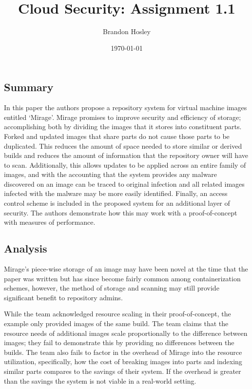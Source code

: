 \documentclass[]{article}
\title{Cloud Security: Assignment 1.1}
\author{Brandon Hosley}
\date{\today}
\begin{document}
\maketitle

\subsection*{Summary}

In this paper \cite{inproceedings} the authors propose a repository system for virtual machine images entitled ‘Mirage’. 
Mirage promises to improve security and efficiency of storage;
accomplishing both by dividing the images that it stores into constituent parts.
Forked and updated images that share parts do not cause those parts to be duplicated.
This reduces the amount of space needed to store similar or derived builds and reduces the amount of information that the repository owner will have to scan.
Additionally, this allows updates to be applied across an entire family of images, and with the accounting that the system provides any malware discovered on an image can be traced to original infection and all related images infected with the malware may be more easily identified.
Finally, an access control scheme is included in the proposed system for an additional layer of security.
The authors demonstrate how this may work with a proof-of-concept with measures of performance.

\subsection*{Analysis}

Mirage’s piece-wise storage of an image may have been novel at the time that the paper was written but has since become fairly common among containerization schemes, 
however, the method of storage and scanning may still provide significant benefit to repository admins.

While the team acknowledged resource scaling in their proof-of-concept, the example only provided images of the same build. 
The team claims that the resource needs of additional images scale proportionally to the difference between images; 
they fail to demonstrate this by providing no differences between the builds.
The team also fails to factor in the overhead of Mirage into the resource utilization, 
specifically, how the cost of breaking images into parts and indexing similar parts compares to the savings of their system.
If the overhead is greater than the savings the system is not viable in a real-world setting.


\clearpage


\end{document}
